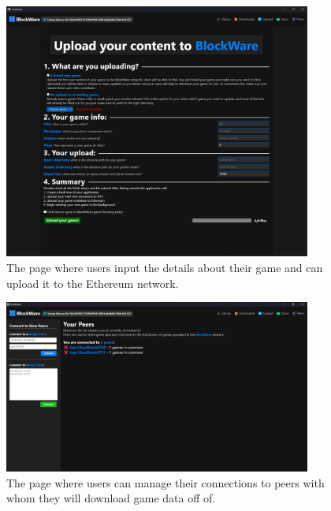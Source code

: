 \begin{figure}[!ht]
  \centering
  \includegraphics[width=0.9\textwidth]{assets/images/screenshots/upload.png}
  \caption{The page where users input the details about their game and can upload it to the Ethereum network.}
\end{figure}

\begin{figure}[!ht]
  \centering
  \includegraphics[width=0.9\textwidth]{assets/images/screenshots/peers.png}
  \caption{The page where users can manage their connections to peers with whom they will download game data off of.}
\end{figure}

